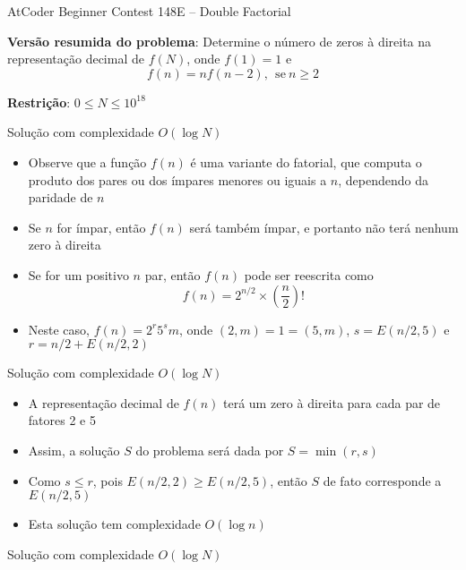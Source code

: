 \begin{frame}[fragile]{AtCoder Beginner Contest 148E -- Double Factorial}

    \textbf{Versão resumida do problema}: Determine o número de zeros à direita na representação
    decimal de $f(N)$, onde $f(1) = 1$ e
    $$
        f(n) = nf(n - 2), \ \ \mbox{se}\ n\geq 2
    $$

    \vspace{0.1in}
    \textbf{Restrição}: $0 \leq N \leq 10^{18}$

\end{frame}

\begin{frame}[fragile]{Solução com complexidade $O(\log N)$}

    \begin{itemize}
        \item Observe que a função $f(n)$ é uma variante do fatorial, que computa o produto dos
            pares ou dos ímpares menores ou iguais a $n$, dependendo da paridade de $n$

        \item Se $n$ for ímpar, então $f(n)$ será também ímpar, e portanto não terá nenhum zero
            à direita

        \item Se for um positivo $n$ par, então $f(n)$ pode ser reescrita como
        $$
            f(n) = 2^{n/2}\times \left(\frac{n}{2}\right)!
        $$

        \item Neste caso, $f(n) = 2^r5^sm$, onde $(2, m) = 1 = (5, m)$, $s = E(n/2, 5)$ e $r = n/2 + E(n/2, 2)$

    \end{itemize}

\end{frame}

\begin{frame}[fragile]{Solução com complexidade $O(\log N)$}

    \begin{itemize}
        \item A representação decimal de $f(n)$ terá um zero à direita para cada par de fatores 2 e 
            5

        \item Assim, a solução $S$ do problema será dada por $S = \min(r, s)$

        \item Como $s\leq r$, pois $E(n/2, 2)\geq E(n/2, 5)$, então $S$ de fato corresponde a
            $E(n/2, 5)$

        \item Esta solução tem complexidade $O(\log n)$
    \end{itemize}

\end{frame}

\begin{frame}[fragile]{Solução com complexidade $O(\log N)$}
\end{frame}
